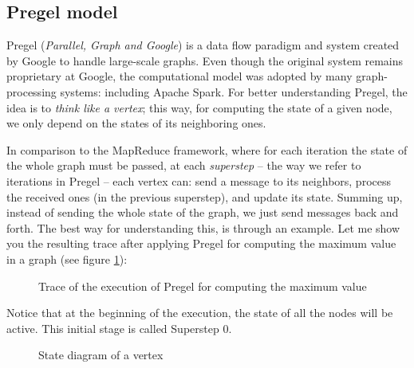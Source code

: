 \subsection{Pregel model}

Pregel (\textit{Parallel, Graph and Google}) is a data flow paradigm and system created by Google to handle large-scale graphs. Even though the original system remains proprietary at Google, the computational model was adopted by many graph-processing systems: including Apache Spark. For better understanding Pregel, the idea is to \textit{think like a vertex}; this way, for computing the state of a given node, we only depend on the states of its neighboring ones.

In comparison to the MapReduce framework, where for each iteration the state of the whole graph must be passed, at each \textit{superstep} -- the way we refer to iterations in Pregel -- each vertex can: send a message to its neighbors, process the received ones (in the previous superstep), and update its state. Summing up, instead of sending the whole state of the graph, we just send messages back and forth. The best way for understanding this, is through an example. Let me show you the resulting trace after applying Pregel for computing the maximum value in a graph (see figure \ref{fig:pregel}):

\begin{figure}[h]
    \centering
    
    \caption[Trace of the execution of Pregel for computing the maximum value]{Trace of the execution of Pregel for computing the maximum value~\cite{10.1145/1807167.1807184}}
    \label{fig:pregel}
\end{figure}

Notice that at the beginning of the execution, the state of all the nodes will be active. This initial stage is called Superstep 0.

\begin{figure}[h]
    \centering
    
    \caption[State diagram of a vertex]{State diagram of a vertex~\cite{10.1145/1807167.1807184}}
    \label{fig:state}
\end{figure}